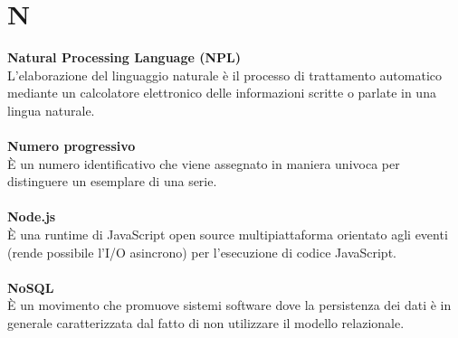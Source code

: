 \section{N}
\textbf{Natural Processing Language (NPL)}\\
L'elaborazione del linguaggio naturale è il processo di trattamento automatico mediante un calcolatore elettronico delle informazioni scritte o parlate in una lingua naturale. \\ \\
\textbf{Numero progressivo}\\ 
È un numero identificativo che viene assegnato in maniera univoca per distinguere un esemplare di una serie. \\ \\
\textbf{Node.js}\\
È una runtime di JavaScript open source multipiattaforma orientato agli eventi (rende possibile l’I/O asincrono) per l'esecuzione di codice JavaScript. \\ \\
\textbf{NoSQL}\\
È un movimento che promuove sistemi software dove la persistenza dei dati è in generale caratterizzata dal fatto di non utilizzare il modello relazionale. \\ \\
\clearpage